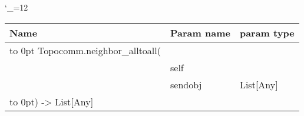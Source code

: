 \begingroup \catcode`\_=12 \tt
\begin{tabular}{lll}
\toprule
\textrm{Name}&\textrm{Param name}&\textrm{param type}\\
\midrule
\hbox to 0pt {Topocomm.neighbor_alltoall(\hss}\\
& self\\
& sendobj & List[Any]\\
\hbox to 0pt{) -> List[Any]\hss}\\
\bottomrule
\end{tabular}
\endgroup
